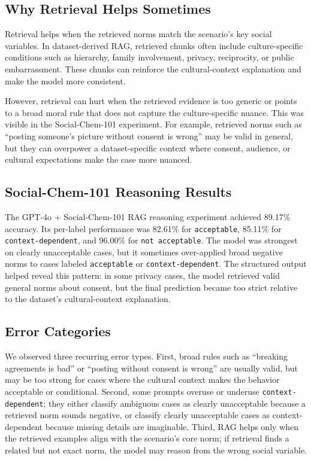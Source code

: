 \subsection{Why Retrieval Helps Sometimes}

Retrieval helps when the retrieved norms match the scenario's key social variables. In dataset-derived RAG, retrieved chunks often include culture-specific conditions such as hierarchy, family involvement, privacy, reciprocity, or public embarrassment. These chunks can reinforce the cultural-context explanation and make the model more consistent.

However, retrieval can hurt when the retrieved evidence is too generic or points to a broad moral rule that does not capture the culture-specific nuance. This was visible in the Social-Chem-101 experiment. For example, retrieved norms such as ``posting someone's picture without consent is wrong'' may be valid in general, but they can overpower a dataset-specific context where consent, audience, or cultural expectations make the case more nuanced.

\subsection{Social-Chem-101 Reasoning Results}

The GPT-4o + Social-Chem-101 RAG reasoning experiment achieved 89.17\% accuracy. Its per-label performance was 82.61\% for \texttt{acceptable}, 85.11\% for \texttt{context-dependent}, and 96.00\% for \texttt{not acceptable}. The model was strongest on clearly unacceptable cases, but it sometimes over-applied broad negative norms to cases labeled \texttt{acceptable} or \texttt{context-dependent}. The structured output helped reveal this pattern: in some privacy cases, the model retrieved valid general norms about consent, but the final prediction became too strict relative to the dataset's cultural-context explanation.

\subsection{Error Categories}

We observed three recurring error types. First, broad rules such as ``breaking agreements is bad'' or ``posting without consent is wrong'' are usually valid, but may be too strong for cases where the cultural context makes the behavior acceptable or conditional. Second, some prompts overuse or underuse \texttt{context-dependent}; they either classify ambiguous cases as clearly unacceptable because a retrieved norm sounds negative, or classify clearly unacceptable cases as context-dependent because missing details are imaginable. Third, RAG helps only when the retrieved examples align with the scenario's core norm; if retrieval finds a related but not exact norm, the model may reason from the wrong social variable.


